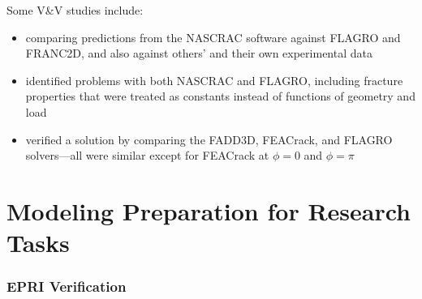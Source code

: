 \begin{frame}
Some V\&V studies include:
\begin{itemize}
\item \citet{favanesi1994} comparing predictions from the NASCRAC software against FLAGRO and FRANC2D, and also against others' and their own experimental data
\item \citet{wilson1995} identified problems with both NASCRAC and FLAGRO, including fracture properties that were treated as constants instead of functions of geometry and load
\item \citet{mcclung2012} verified a \K solution by comparing the FADD3D, FEACrack, and FLAGRO solvers---all were similar except for FEACrack at \(\phi=0\) and \(\phi=\pi\)
\end{itemize}
\end{frame}

\part{Modeling Preparation for Research Tasks%
%
}

\section{EPRI \hone Verification}

